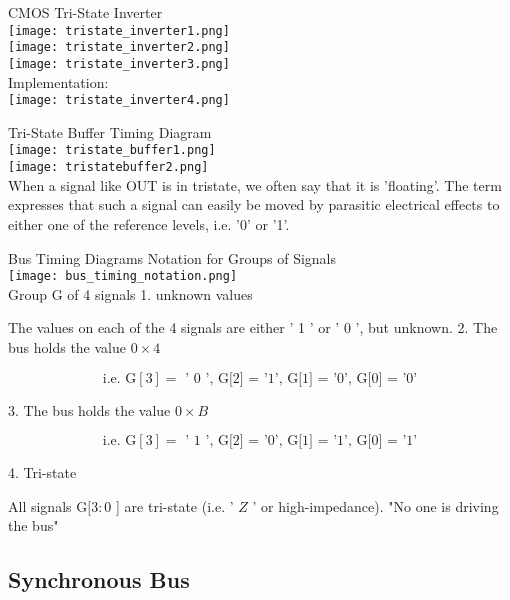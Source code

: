 \begin{definition}{CMOS Tri-State Inverter}\\
    \texttt{[image: tristate\_inverter1.png]}\\
    \texttt{[image: tristate\_inverter2.png]}\\
    \texttt{[image: tristate\_inverter3.png]}\\
    Implementation:\\
    \texttt{[image: tristate\_inverter4.png]}
\end{definition}

\begin{concept}{Tri-State Buffer} Timing Diagram\\
    \texttt{[image: tristate\_buffer1.png]}\\
    \texttt{[image: tristatebuffer2.png]}\\
    When a signal like OUT is in tristate, we often say that it is 'floating'. 
    The term expresses that such a signal can easily be moved by parasitic electrical effects
    to either one of the reference levels, i.e. '0' or '1'.
\end{concept}

\begin{theorem}{Bus Timing Diagrams} Notation for Groups of Signals\\
    \texttt{[image: bus\_timing\_notation.png]}\\
    Group G of 4 signals
1. unknown values

The values on each of the 4 signals are either ' 1 ' or ' 0 ', but unknown.
2. The bus holds the value $0 \times 4$

$$
\text { i.e. } \mathrm{G}[3]=\text { ' } 0 \text { ', G[2] = '1', G[1] = '0', G[0] = '0' }
$$

3. The bus holds the value $0 \times B$

$$
\text { i.e. } \mathrm{G}[3]=\text { ' } 1 \text { ', G[2] = '0', G[1] = '1', G[0] = '1' }
$$

4. Tri-state

All signals $\mathrm{G}[3: 0$ ] are tri-state (i.e. ' $Z$ ' or high-impedance). "No one is driving the bus"
\end{theorem}



\subsection{Synchronous Bus}

